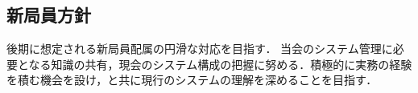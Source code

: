 \subsection*{新局員方針}


後期に想定される新局員配属の円滑な対応を目指す．
当会のシステム管理に必要となる知識の共有，現会のシステム構成の把握に努める．積極的に実務の経験を積む機会を設け，\secondGrade{}と共に現行のシステムの理解を深めることを目指す．

